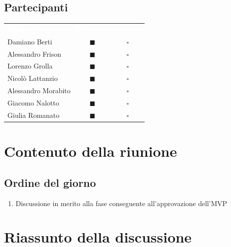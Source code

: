 \documentclass[a4paper, 11pt]{article}
\begin{document}
\subsection{Partecipanti}
\begin{center}
    \begin{tabular}{>{\raggedright\arraybackslash}p{6cm} c c}
        \rowcolor{AccentColor}
        \textcolor{white}{\textbf{Nome e Cognome}} & 
        \textcolor{white}{\textbf{Presente}} & 
        \textcolor{white}{\textbf{Assente}} \\
        
        Damiano Berti     & \textcolor{AccentColor}{$\blacksquare$}    & $\square$        \\
        Alessandro Frison   & \textcolor{AccentColor}{$\blacksquare$}    & $\square$        \\
        Lorenzo Grolla     & \textcolor{AccentColor}{$\blacksquare$}    & $\square$        \\
        Nicolò Lattanzio    & \textcolor{AccentColor}{$\blacksquare$}    & $\square$        \\
        Alessandro Morabito   & \textcolor{AccentColor}{$\blacksquare$}    & $\square$        \\
        Giacomo Nalotto   & \textcolor{AccentColor}{$\blacksquare$}    & $\square$        \\
        Giulia Romanato   & \textcolor{AccentColor}{$\blacksquare$}    & $\square$        \\
    \end{tabular}
\end{center}

\section{Contenuto della riunione}
\subsection{Ordine del giorno}
\begin{enumerate}
    \item Discussione in merito alla fase conseguente all'approvazione dell'MVP
\end{enumerate}
\newpage
\section{Riassunto della discussione}
\end{document}
